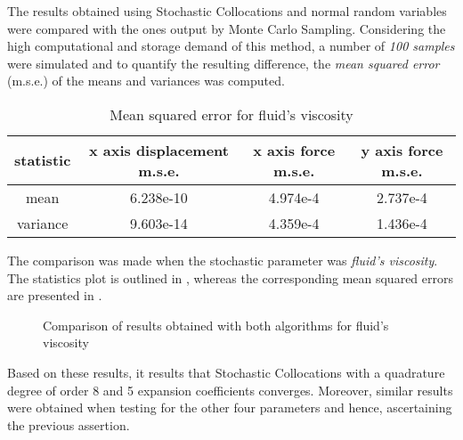 	The results obtained using Stochastic Collocations and normal random variables were compared with the ones output by Monte Carlo Sampling. Considering the high computational and storage demand of this method, a number of \emph{100 samples} were simulated and to quantify the resulting difference, the \emph{mean squared error} (m.s.e.) of the means and variances was computed. 
\begin{table}[h!]
\centering
 \begin{tabular}{|c|c|c|c|} 
 \hline
 statistic & x axis displacement m.s.e. & x axis force m.s.e. & y axis force m.s.e. \\
 \hline 
 mean & 6.238e-10 & 4.974e-4 & 2.737e-4 \\
 \hline 
 variance & 9.603e-14 & 4.359e-4 & 1.436e-4 \\
  \hline
 \end{tabular}
 \caption{Mean squared error for fluid's viscosity}
 \label{table:MCS_SCS_mse}
\end{table}
The comparison was made when the stochastic parameter was \emph{fluid's viscosity}. The statistics plot is outlined in , whereas the corresponding mean squared errors are presented in .
\begin{figure}[htbp]
  \centering
  \hfill
  \caption{Comparison of results obtained with both algorithms for fluid's viscosity}
  \label{MCS_SCS_com}
  \vspace{-0.4cm}
\end{figure}
Based on these results, it results that Stochastic Collocations with a quadrature degree of order 8 and 5 expansion coefficients converges. Moreover, similar results were obtained when testing for the other four parameters and hence, ascertaining the previous assertion.

